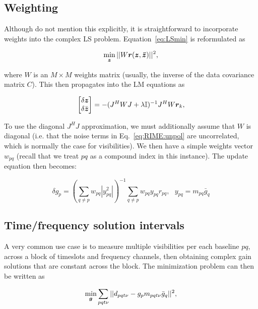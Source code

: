 \documentclass[useAMS,usenatbib]{mn2e}
\newcommand{\II}{\mathbb{I}}
\newcommand{\zz}{\bmath{z}}
\newcommand{\JJ}{J} %
\begin{document}
\subsection{Weighting}

Although \citet{ComplexOpt} do not mention this explicitly, it is straightforward to incorporate weights into the 
complex LS problem. Equation~\ref{eq:LSmin} is reformulated as

\begin{equation}
\label{eq:LSmin:w}
\min_{\bmath{z}} ||W \bmath{r}(\bmath{z},\bmath{\bar z})||^2,
\end{equation}

where $W$ is an $M\times M$ weights matrix (usually, the inverse of the data covariance matrix $C$). This then propagates into the 
LM equations as

\begin{equation}
\label{eq:LM:W}
\Matrix{c}{\delta \zz \\ \delta \bar{\zz}} = -(\JJ^H W \JJ + \lambda\II)^{-1}\JJ^H W \bmath{r}_k,
\end{equation}

To use the diagonal $\JJ^H\JJ$ approximation, we must additionally assume that $W$ is diagonal (i.e. that the noise terms
in Eq.~\ref{eq:RIME:unpol} are uncorrelated, which is normally the case for visibilities). We then have a simple weights vector
$w_{pq}$ (recall that we treat $pq$ as a compound index in this instance). The update equation then becomes:

\begin{equation}
\label{eq:JHJ:diag:W}
\delta g_p = \left( \sum\limits_{q\ne p} w_{pq} |y^2_{pq}| \right )^{-1} \sum\limits_{q\ne p} w_{pq} y_{pq} r_{pq},~~~y_{pq}=m_{pq}\bar{g}_q
\end{equation}

\subsection{Time/frequency solution intervals}

A very common use case is to measure multiple visibilities per each baseline $pq$, across a block of timeslots and frequency 
channels, then obtaining complex gain solutions that are constant across the block. The minimization problem can then
be written as

\begin{equation}
\label{eq:cal:DI:tf}
\min_{\bmath{g}}\sum_{pqt\nu}||d_{pqt\nu}-g_p m_{pqt\nu} \bar{g}_q||^2, 
\end{equation}
\end{document}
